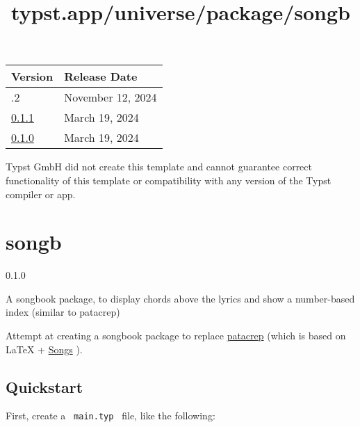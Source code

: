 \begin{longtable}[]{@{}ll@{}}
\toprule\noalign{}
Version & Release Date \\
\midrule\noalign{}
\endhead
\bottomrule\noalign{}
\endlastfoot
0.1.2 & November 12, 2024 \\
\href{https://typst.app/universe/package/fuzzy-cnoi-statement/0.1.1/}{0.1.1}
& March 19, 2024 \\
\href{https://typst.app/universe/package/fuzzy-cnoi-statement/0.1.0/}{0.1.0}
& March 19, 2024 \\
\end{longtable}

Typst GmbH did not create this template and cannot guarantee correct
functionality of this template or compatibility with any version of the
Typst compiler or app.


\title{typst.app/universe/package/songb}

\label{banner}
\section{songb}\label{songb}

{ 0.1.0 }

A songbook package, to display chords above the lyrics and show a
number-based index (similar to patacrep)

\label{readme}
Attempt at creating a songbook package to replace
\href{https://github.com/patacrep/patacrep}{patacrep} (which is based on
LaTeX + \href{https://songs.sourceforge.net/}{Songs} ).

\subsection{Quickstart}\label{quickstart}

First, create a \texttt{\ main.typ\ } file, like the following:

